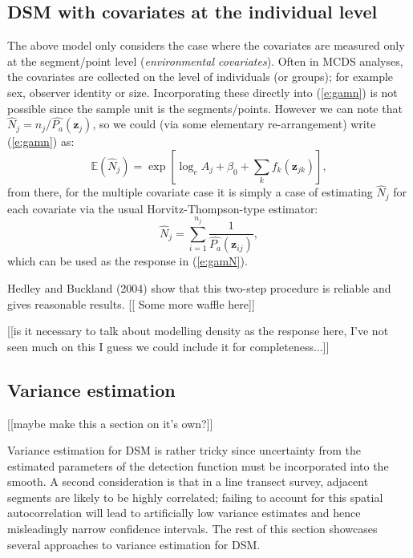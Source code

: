 \documentclass[useAMS,referee]{biom}
\begin{document}
\subsection{DSM with covariates at the individual level}

The above model only considers the case where the covariates are measured only at the segment/point level (\textit{environmental covariates}). Often in MCDS analyses, the covariates are collected on the level of individuals (or groups); for example sex, observer identity or size. Incorporating these directly into (\ref{e:gamn}) is not possible since the sample unit is the segments/points. However we can note that $\hat{N}_j = n_j/\hat{P_a}(\mathbf{z}_j)$, so we could (via some elementary re-arrangement) write (\ref{e:gamn}) as:
\begin{equation}
\mathbb{E}(\hat{N}_j) = \exp\left[ \log_e A_j + \beta_0 + \sum_k f_k\left(\bm{z}_{jk}\right) \right],
\label{e:gamN}
\end{equation}
from there, for the multiple covariate case it is simply a case of estimating $\hat{N}_j$ for each covariate via the usual Horvitz-Thompson-type estimator:
\begin{equation*}
\hat{N}_j = \sum_{i=1}^{n_j} \frac{1}{\hat{P_a}(\mathbf{z}_{ij})},
\end{equation*}
which can be used as the response in (\ref{e:gamN}). 

Hedley and Buckland (2004) show that this two-step procedure is reliable and gives reasonable results. [[ Some more waffle here]]

[[is it necessary to talk about modelling density as the response here, I've not seen much on this I guess we could include it for completeness...]]


\subsection{Variance estimation}
[[maybe make this a section on it's own?]]

Variance estimation for DSM is rather tricky since uncertainty from the estimated parameters of the detection function must be incorporated into the smooth. A second consideration is that in a line transect survey, adjacent segments are likely to be highly correlated; failing to account for this spatial autocorrelation will lead to artificially low variance estimates and hence misleadingly narrow confidence intervals. The rest of this section showcases several approaches to variance estimation for DSM.
\end{document}
